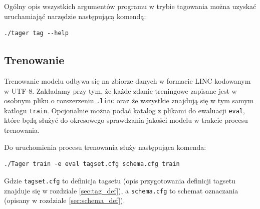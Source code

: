 \documentclass[a4paper,10]{article}
\begin{document}
Ogólny opis wszystkich argumentów programu w trybie tagowania
można uzyskać uruchamiająć narzędzie następującą komendą:
\begin{verbatim}
./tager tag --help
\end{verbatim}

\subsection{Trenowanie}

Trenowanie modelu odbywa się na zbiorze danych w formacie LINC
kodowanym w UTF-8. Zakładamy przy tym, że każde zdanie treningowe
zapisane jest w osobnym pliku o rozszerzeniu \verb|.linc| oraz
że wszystkie znajdują się w tym samym katlogu \verb|train|.
Opcjonalnie można podać katalog z plikami do ewaluacji \verb|eval|,
które będą służyć do okresowego sprawdzania jakości modelu w trakcie
procesu trenowania.

Do uruchomienia procesu trenowania służy następująca komenda:
\begin{verbatim}
./Tager train -e eval tagset.cfg schema.cfg train
\end{verbatim}
Gdzie \verb|tagset.cfg| to definicja tagsetu (opis przygotowania
definicji tagsetu znajduje się w rozdziale \ref{sec:tag_def}),
a \verb|schema.cfg| to schemat oznaczania (opisany w rozdziale
\ref{sec:schema_def}).
\end{document}
